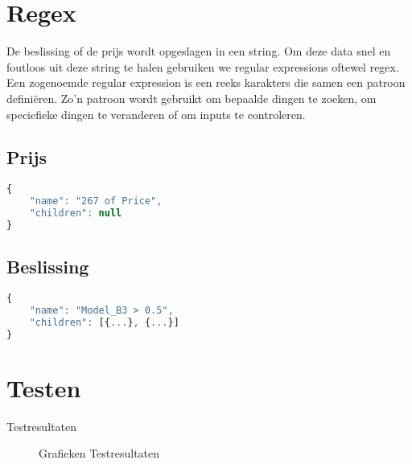 \section{Regex}
De beslissing of de prijs wordt opgeslagen in een string. Om deze data snel en foutloos uit deze string te halen gebruiken we regular expressions oftewel regex. Een zogenoemde regular expression is een reeks karakters die samen een patroon definiëren. Zo'n patroon wordt gebruikt om bepaalde dingen te zoeken, om speciefieke dingen te veranderen of om inputs te controleren.\cite{wiki:regex}

\subsection{Prijs}
\begin{lstlisting}[language=JavaScript]
{
    "name": "267 of Price",
    "children": null
}    
\end{lstlisting}
\subsection{Beslissing}

\begin{lstlisting}[language=JavaScript]
{
    "name": "Model_B3 > 0.5",
    "children": [{...}, {...}]
}    
\end{lstlisting}

\section{Testen}
\begin{table}
    \centering
    \caption{Testresultaten}
    \label{tab:test_results}
\end{table}

\begin{figure}[ht]
    \centering

    
    \caption{Grafieken Testresultaten}
    \label{fig:test_result}
\end{figure}

